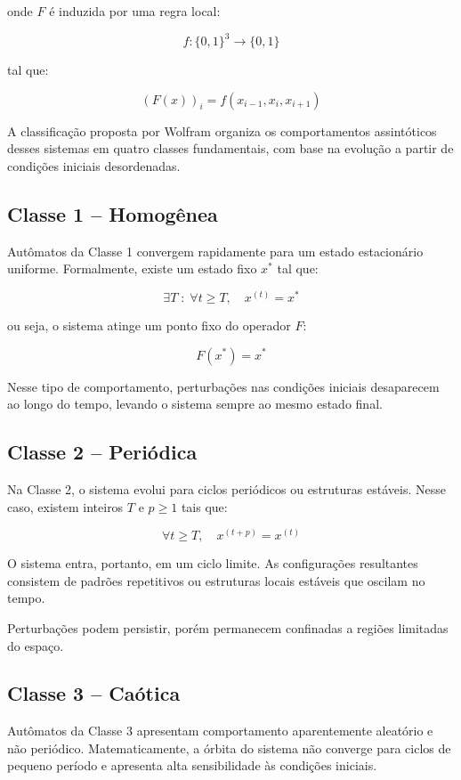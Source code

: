 onde $F$ é induzida por uma regra local:

\[
f : \{0,1\}^3 \rightarrow \{0,1\}
\]

tal que:

\[
(F(x))_i = f(x_{i-1}, x_i, x_{i+1})
\]

A classificação proposta por Wolfram organiza os comportamentos assintóticos desses sistemas em quatro classes fundamentais, com base na evolução a partir de condições iniciais desordenadas.

\subsection{Classe 1 -- Homogênea}

Autômatos da Classe 1 convergem rapidamente para um estado estacionário uniforme. Formalmente, existe um estado fixo $x^*$ tal que:

\[
\exists T \; : \; \forall t \ge T, \quad x^{(t)} = x^*
\]

ou seja, o sistema atinge um ponto fixo do operador $F$:

\[
F(x^*) = x^*
\]

Nesse tipo de comportamento, perturbações nas condições iniciais desaparecem ao longo do tempo, levando o sistema sempre ao mesmo estado final.

\subsection{Classe 2 -- Periódica}

Na Classe 2, o sistema evolui para ciclos periódicos ou estruturas estáveis. Nesse caso, existem inteiros $T$ e $p \geq 1$ tais que:

\[
\forall t \ge T, \quad x^{(t+p)} = x^{(t)}
\]

O sistema entra, portanto, em um ciclo limite. As configurações resultantes consistem de padrões repetitivos ou estruturas locais estáveis que oscilam no tempo.

Perturbações podem persistir, porém permanecem confinadas a regiões limitadas do espaço.

\subsection{Classe 3 -- Caótica}

Autômatos da Classe 3 apresentam comportamento aparentemente aleatório e não periódico. Matematicamente, a órbita do sistema não converge para ciclos de pequeno período e apresenta alta sensibilidade às condições iniciais.

